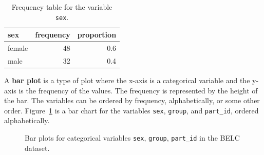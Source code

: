 \documentclass[
  letterpaper,
  DIV=11,
  numbers=noendperiod]{scrreport}
\theoremstyle{definition}
\theoremstyle{remark}
\begin{document}
\hypertarget{tbl-aa-belc-frequency-table}{}
\begin{table}
\caption{\label{tbl-aa-belc-frequency-table}Frequency table for the variable \texttt{sex}. }\tabularnewline

\centering
\begin{tabular}{l|r|r}
\hline
sex & frequency & proportion\\
\hline
female & 48 & 0.6\\
\hline
male & 32 & 0.4\\
\hline
\end{tabular}
\end{table}

A \textbf{bar plot} is a type of plot where the x-axis is a categorical
variable and the y-axis is the frequency of the values. The frequency is
represented by the height of the bar. The variables can be ordered by
frequency, alphabetically, or some other order.
Figure~\ref{fig-aa-belc-barplots} is a bar chart for the variables
\texttt{sex}, \texttt{group}, and \texttt{part\_id}, ordered
alphabetically.

\begin{figure}

\begin{minipage}[t]{0.33\linewidth}

{\centering 


}

\end{minipage}%
%
\begin{minipage}[t]{0.33\linewidth}

{\centering 


}

\end{minipage}%
%
\begin{minipage}[t]{0.33\linewidth}

{\centering 


}

\end{minipage}%

\caption{\label{fig-aa-belc-barplots}Bar plots for categorical variables
\texttt{sex}, \texttt{group}, \texttt{part\_id} in the BELC dataset.}

\end{figure}
\end{document}
